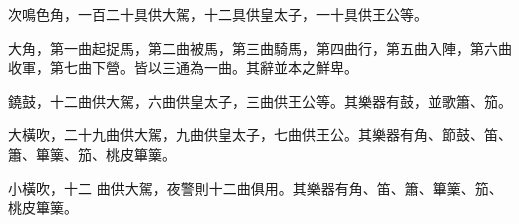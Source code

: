 \begin{pinyinscope}
 次鳴色角，一百二十具供大駕，十二具供皇太子，一十具供王公等。



 大角，第一曲起捉馬，第二曲被馬，第三曲騎馬，第四曲行，第五曲入陣，第六曲收軍，第七曲下營。皆以三通為一曲。其辭並本之鮮卑。



 鐃鼓，十二曲供大駕，六曲供皇太子，三曲供王公等。其樂器有鼓，並歌簫、笳。



 大橫吹，二十九曲供大駕，九曲供皇太子，七曲供王公。其樂器有角、節鼓、笛、簫、篳篥、笳、桃皮篳篥。



 小橫吹，十二
 曲供大駕，夜警則十二曲俱用。其樂器有角、笛、簫、篳篥、笳、桃皮篳篥。



\end{pinyinscope}